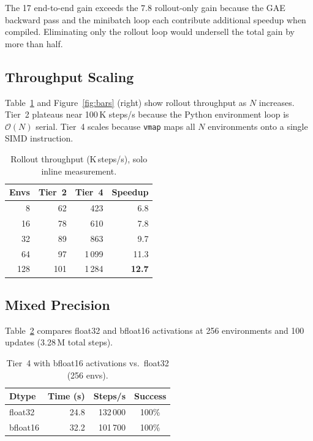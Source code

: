 \documentclass[11pt,twocolumn]{article}
\begin{document}
The 17\texttimes{} end-to-end gain exceeds the 7.8\texttimes{} rollout-only
gain because the GAE backward pass and the minibatch loop each contribute
additional speedup when compiled. Eliminating only the rollout loop would
undersell the total gain by more than half.

\subsection{Throughput Scaling}

Table~\ref{tab:scaling} and Figure~\ref{fig:bars} (right) show rollout
throughput as $N$ increases. Tier~2 plateaus near 100\,K steps/s because the
Python environment loop is $\mathcal{O}(N)$ serial. Tier~4 scales because
\texttt{vmap} maps all $N$ environments onto a single SIMD instruction.

\begin{table}[H]
\centering
\footnotesize
\caption{Rollout throughput (K\,steps/s), solo inline measurement.}
\label{tab:scaling}
\begin{tabular}{rrrr}
\toprule
Envs & Tier~2 & Tier~4 & Speedup \\
\midrule
  8 &  62 &   423 &  6.8\texttimes{} \\
 16 &  78 &   610 &  7.8\texttimes{} \\
 32 &  89 &   863 &  9.7\texttimes{} \\
 64 &  97 & 1\,099 & 11.3\texttimes{} \\
128 & 101 & 1\,284 & \textbf{12.7\texttimes{}} \\
\bottomrule
\end{tabular}
\end{table}

\subsection{Mixed Precision}

Table~\ref{tab:bf16} compares float32 and bfloat16 activations at 256
environments and 100 updates (3.28\,M total steps).

\begin{table}[H]
\centering
\small
\caption{Tier~4 with bfloat16 activations vs.\ float32 (256 envs).}
\label{tab:bf16}
\begin{tabular}{lrrc}
\toprule
Dtype & Time (s) & Steps/s & Success \\
\midrule
float32  & 24.8 & 132\,000 & 100\% \\
bfloat16 & 32.2 & 101\,700 & 100\% \\
\bottomrule
\end{tabular}
\end{table}
\end{document}
